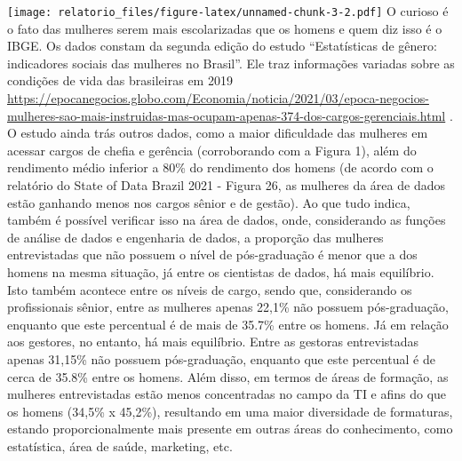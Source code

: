 \documentclass[
]{article}
\begin{document}
\texttt{[image: relatorio\_files/figure-latex/unnamed-chunk-3-2.pdf]} O
curioso é o fato das mulheres serem mais escolarizadas que os homens e
quem diz isso é o IBGE. Os dados constam da segunda edição do estudo
``Estatísticas de gênero: indicadores sociais das mulheres no Brasil''.
Ele traz informações variadas sobre as condições de vida das brasileiras
em 2019
\url{https://epocanegocios.globo.com/Economia/noticia/2021/03/epoca-negocios-mulheres-sao-mais-instruidas-mas-ocupam-apenas-374-dos-cargos-gerenciais.html}
. O estudo ainda trás outros dados, como a maior dificuldade das
mulheres em acessar cargos de chefia e gerência (corroborando com a
Figura 1), além do rendimento médio inferior a 80\% do rendimento dos
homens (de acordo com o relatório do State of Data Brazil 2021 - Figura
26, as mulheres da área de dados estão ganhando menos nos cargos sênior
e de gestão). Ao que tudo indica, também é possível verificar isso na
área de dados, onde, considerando as funções de análise de dados e
engenharia de dados, a proporção das mulheres entrevistadas que não
possuem o nível de pós-graduação é menor que a dos homens na mesma
situação, já entre os cientistas de dados, há mais equilíbrio. Isto
também acontece entre os níveis de cargo, sendo que, considerando os
profissionais sênior, entre as mulheres apenas 22,1\% não possuem
pós-graduação, enquanto que este percentual é de mais de 35.7\% entre os
homens. Já em relação aos gestores, no entanto, há mais equilíbrio.
Entre as gestoras entrevistadas apenas 31,15\% não possuem
pós-graduação, enquanto que este percentual é de cerca de 35.8\% entre
os homens. Além disso, em termos de áreas de formação, as mulheres
entrevistadas estão menos concentradas no campo da TI e afins do que os
homens (34,5\% x 45,2\%), resultando em uma maior diversidade de
formaturas, estando proporcionalmente mais presente em outras áreas do
conhecimento, como estatística, área de saúde, marketing, etc.
\end{document}
